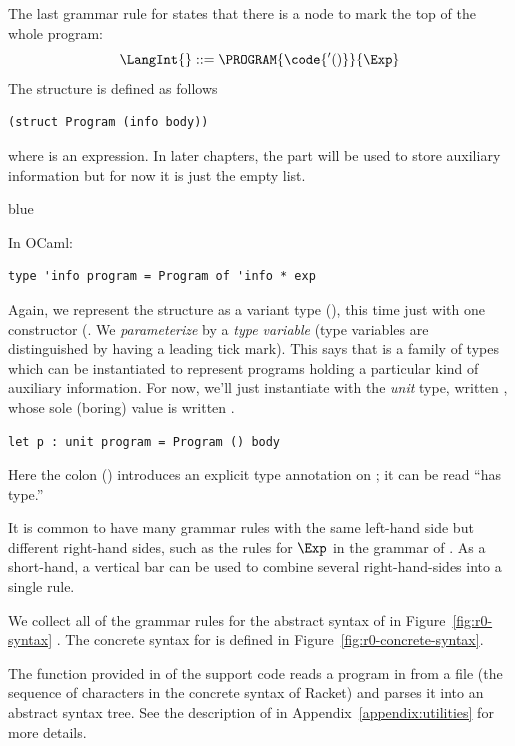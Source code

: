\documentclass[11pt]{book}
\newcommand{\ocaml}[1]{{\color{blue}{#1}}}
\newenvironment{ocamlx}{
  \begin{color}{blue}
}
{
  \end{color}
}
\begin{document}
The last grammar rule for \LangInt{} states that there is a 
node to mark the top of the whole program:
\[
  \LangInt{} ::= \PROGRAM{\code{'()}}{\Exp}
\]
The  structure is defined as follows
\begin{lstlisting}
(struct Program (info body))
\end{lstlisting}
where  is an expression. In later chapters, the 
part will be used to store auxiliary information but for now it is
just the empty list.
\begin{ocamlx}
  In OCaml:
  \begin{lstlisting}[style=ocaml]
    type 'info program = Program of 'info * exp
  \end{lstlisting}
  Again, we represent the structure as a variant type
  (), this time just with one constructor
  (.  We \emph{parameterize}  by a
  \emph{type variable}  (type variables are distinguished by having
  a leading tick  mark).  This says that  is a family of types which can
  be instantiated to represent programs holding a particular kind of auxiliary information.
  For now, we'll just instantiate 
  with the \emph{unit} type, written , whose sole (boring)
  value is written \code{()}.
  \begin{lstlisting}[style=ocaml]
    let p : unit program = Program () body
  \end{lstlisting}
  Here the colon (\code{:}) introduces an explicit type annotation on ; it can be read ``has type.''
\end{ocamlx}

It is common to have many grammar rules with the same left-hand side
but different right-hand sides, such as the rules for $\Exp$ in the
grammar of \LangInt{}. As a short-hand, a vertical bar can be used to
combine several right-hand-sides into a single rule.

We collect all of the grammar rules for the abstract syntax of \LangInt{}
in Figure~\ref{fig:r0-syntax} \ocaml{along with the corresponding OCaml type definitions}.
The concrete syntax for \LangInt{} is
defined in Figure~\ref{fig:r0-concrete-syntax}.

The  function provided in  of
the support code reads a program in from a file (the sequence of
characters in the concrete syntax of Racket) and parses it into an
abstract syntax tree. See the description of  in
Appendix~\ref{appendix:utilities} for more details.
\end{document}
